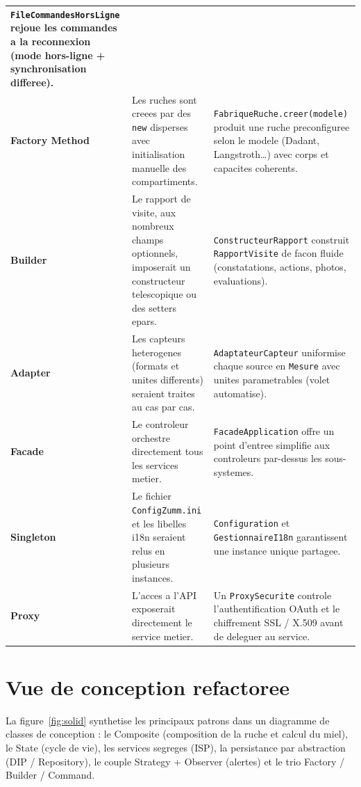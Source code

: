 \begin{xltabular}{\textwidth}{>{\bfseries}p{2.7cm} p{5.9cm} X}
\texttt{FileCommandesHorsLigne} rejoue les commandes a la reconnexion
(mode hors-ligne + synchronisation differee). \\
Factory Method  &
Les ruches sont creees par des \texttt{new} disperses avec initialisation
manuelle des compartiments. &
\texttt{FabriqueRuche.creer(modele)} produit une ruche preconfiguree selon le
modele (Dadant, Langstroth\ldots) avec corps et capacites coherents. \\
Builder  &
Le rapport de visite, aux nombreux champs optionnels, imposerait un constructeur
telescopique ou des setters epars. &
\texttt{ConstructeurRapport} construit \texttt{RapportVisite} de facon fluide
(constatations, actions, photos, evaluations). \\
Adapter  &
Les capteurs heterogenes (formats et unites differents) seraient traites au cas
par cas. &
\texttt{AdaptateurCapteur} uniformise chaque source en \texttt{Mesure} avec
unites parametrables (volet automatise). \\
Facade  &
Le controleur orchestre directement tous les services metier. &
\texttt{FacadeApplication} offre un point d'entree simplifie aux controleurs
par-dessus les sous-systemes. \\
Singleton  &
Le fichier \texttt{ConfigZumm.ini} et les libelles i18n seraient relus en
plusieurs instances. &
\texttt{Configuration} et \texttt{GestionnaireI18n} garantissent une instance
unique partagee. \\
Proxy  &
L'acces a l'API exposerait directement le service metier. &
Un \texttt{ProxySecurite} controle l'authentification OAuth et le chiffrement
SSL / X.509 avant de deleguer au service. \\
\bottomrule
\end{xltabular}

\section{Vue de conception refactoree}
La figure~\ref{fig:solid} synthetise les principaux patrons dans un diagramme
de classes de conception : le Composite (composition de la ruche et calcul du
miel), le State (cycle de vie), les services segreges (ISP), la persistance par
abstraction (DIP / Repository), le couple Strategy + Observer (alertes) et le
trio Factory / Builder / Command.

